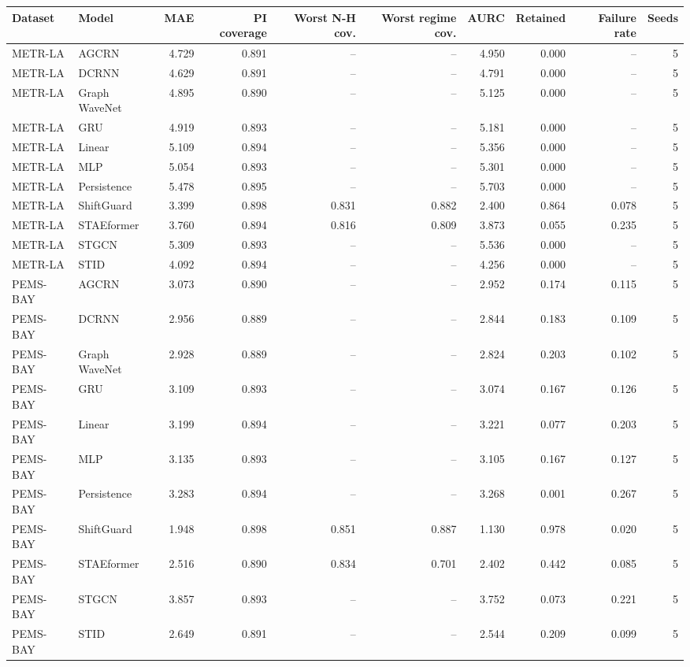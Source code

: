 \begin{tabular}{llrrrrrrrr}
\toprule
Dataset & Model & MAE & PI coverage & Worst N-H cov. & Worst regime cov. & AURC & Retained & Failure rate & Seeds \\
\midrule
METR-LA & AGCRN & 4.729 & 0.891 & -- & -- & 4.950 & 0.000 & -- & 5 \\
METR-LA & DCRNN & 4.629 & 0.891 & -- & -- & 4.791 & 0.000 & -- & 5 \\
METR-LA & Graph WaveNet & 4.895 & 0.890 & -- & -- & 5.125 & 0.000 & -- & 5 \\
METR-LA & GRU & 4.919 & 0.893 & -- & -- & 5.181 & 0.000 & -- & 5 \\
METR-LA & Linear & 5.109 & 0.894 & -- & -- & 5.356 & 0.000 & -- & 5 \\
METR-LA & MLP & 5.054 & 0.893 & -- & -- & 5.301 & 0.000 & -- & 5 \\
METR-LA & Persistence & 5.478 & 0.895 & -- & -- & 5.703 & 0.000 & -- & 5 \\
METR-LA & ShiftGuard & 3.399 & 0.898 & 0.831 & 0.882 & 2.400 & 0.864 & 0.078 & 5 \\
METR-LA & STAEformer & 3.760 & 0.894 & 0.816 & 0.809 & 3.873 & 0.055 & 0.235 & 5 \\
METR-LA & STGCN & 5.309 & 0.893 & -- & -- & 5.536 & 0.000 & -- & 5 \\
METR-LA & STID & 4.092 & 0.894 & -- & -- & 4.256 & 0.000 & -- & 5 \\
PEMS-BAY & AGCRN & 3.073 & 0.890 & -- & -- & 2.952 & 0.174 & 0.115 & 5 \\
PEMS-BAY & DCRNN & 2.956 & 0.889 & -- & -- & 2.844 & 0.183 & 0.109 & 5 \\
PEMS-BAY & Graph WaveNet & 2.928 & 0.889 & -- & -- & 2.824 & 0.203 & 0.102 & 5 \\
PEMS-BAY & GRU & 3.109 & 0.893 & -- & -- & 3.074 & 0.167 & 0.126 & 5 \\
PEMS-BAY & Linear & 3.199 & 0.894 & -- & -- & 3.221 & 0.077 & 0.203 & 5 \\
PEMS-BAY & MLP & 3.135 & 0.893 & -- & -- & 3.105 & 0.167 & 0.127 & 5 \\
PEMS-BAY & Persistence & 3.283 & 0.894 & -- & -- & 3.268 & 0.001 & 0.267 & 5 \\
PEMS-BAY & ShiftGuard & 1.948 & 0.898 & 0.851 & 0.887 & 1.130 & 0.978 & 0.020 & 5 \\
PEMS-BAY & STAEformer & 2.516 & 0.890 & 0.834 & 0.701 & 2.402 & 0.442 & 0.085 & 5 \\
PEMS-BAY & STGCN & 3.857 & 0.893 & -- & -- & 3.752 & 0.073 & 0.221 & 5 \\
PEMS-BAY & STID & 2.649 & 0.891 & -- & -- & 2.544 & 0.209 & 0.099 & 5 \\
\bottomrule
\end{tabular}
